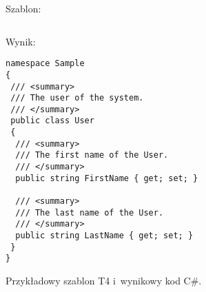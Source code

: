 \begin{figure}[!ht]
Szablon:

\begin{verbatim}

\end{verbatim}

Wynik:

\begin{verbatim}
namespace Sample
{
 /// <summary>
 /// The user of the system.
 /// </summary>
 public class User
 {
  /// <summary>
  /// The first name of the User.
  /// </summary>
  public string FirstName { get; set; }
  
  /// <summary>
  /// The last name of the User.
  /// </summary>
  public string LastName { get; set; }
 }
}
\end{verbatim}

\caption{Przykładowy szablon T4 i~wynikowy kod C\#.}
\label{fig:implementation_core:t4}
\end{figure}
